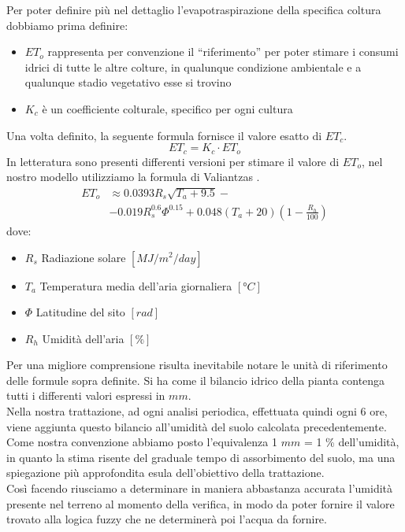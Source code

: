 \documentclass[conference,10pt]{IEEEtran}
\begin{document}
Per poter definire più nel dettaglio l'evapotraspirazione della specifica coltura dobbiamo prima definire:
\begin{itemize}
	\item $ET_o$ rappresenta per convenzione il “riferimento” per poter stimare i consumi idrici di tutte le
	altre colture, in qualunque condizione ambientale e a qualunque stadio vegetativo esse si trovino
	\item $K_c$ è un coefficiente colturale, specifico per ogni cultura
\end{itemize}
Una volta definito, la seguente formula fornisce il valore esatto di $ET_c$.
\begin{equation*}
ET_c = K_c \cdot ET_o
\end{equation*}
In letteratura sono presenti differenti versioni per stimare il valore di $ET_o$, nel nostro modello utilizziamo la formula di Valiantzas \cite{8}. \\
\begin{equation*}
\begin{split}
ET_o &\approx 0.0393R_s\sqrt{T_a + 9.5} -\\ &-0.019R_s^{0.6}\Phi^{0.15}+0.048(T_a+20)(1-\frac{R_h}{100})
\end{split}
\end{equation*} 
dove:
\begin{itemize}
	\item $R_s$ Radiazione solare $[MJ/m^2/day]$
	\item $T_a$ Temperatura media dell'aria giornaliera $[°C]$
	\item $\Phi$ Latitudine del sito $[rad]$
	\item $R_h$ Umidità dell'aria $[\%]$
	\newline
\end{itemize}
Per una migliore comprensione risulta inevitabile notare le unità di riferimento delle formule sopra definite.
Si ha come il bilancio idrico della pianta contenga tutti i differenti valori espressi in $mm$.
\\Nella nostra trattazione, ad ogni analisi periodica, effettuata quindi ogni 6 ore, viene aggiunta questo bilancio all'umidità del suolo calcolata precedentemente. Come nostra convenzione abbiamo posto l'equivalenza 1 $mm$ = 1 \% dell'umidità, in quanto la stima risente del graduale tempo di assorbimento del suolo, ma una spiegazione più approfondita esula dell'obiettivo della trattazione.
\\ Così facendo riusciamo a determinare in maniera abbastanza accurata l'umidità presente nel terreno al momento della verifica, in modo da poter fornire il valore trovato alla logica fuzzy che ne determinerà poi l'acqua da fornire. \\
\end{document}
